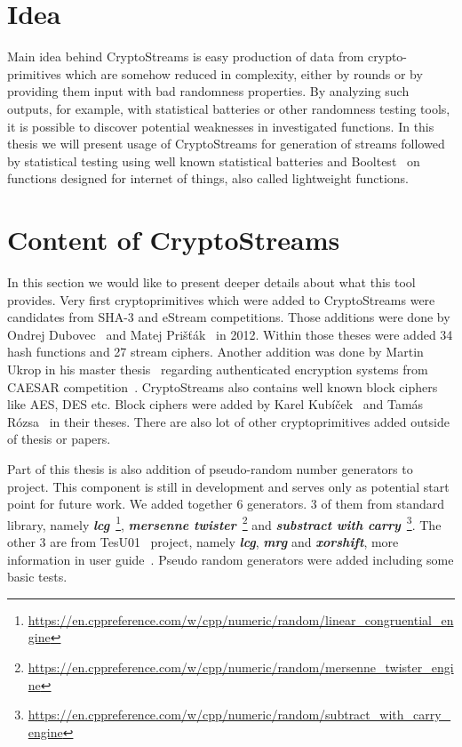 \documentclass[
    digital,    %
    oneside,    %
    color,
    11pt,
    nocover,
    notable,
    nolof,
    nolot,
    final
]{fithesis3}
\begin{document}
\section{Idea}

Main idea behind CryptoStreams is easy production of data from crypto-primitives which are somehow reduced in complexity, either by rounds or by providing them input with bad randomness properties. By analyzing such outputs, for example, with statistical batteries or other randomness testing tools, it is possible to discover potential weaknesses in investigated functions. In this thesis we will present usage of CryptoStreams for generation of streams followed by statistical testing using well known statistical batteries and Booltest~\cite{booltest-secrypt2017} on functions designed for internet of things, also called lightweight functions.

\section{Content of CryptoStreams}

In this section we would like to present deeper details about what this tool provides. Very first cryptoprimitives which were added to CryptoStreams were candidates from SHA-3 and eStream competitions. Those additions were done by Ondrej Dubovec~\cite{Dubovec2012thesis} and Matej Prišťák~\cite{Pristak2012thesis} in 2012. Within those theses were added 34 hash functions and 27 stream ciphers. Another addition was done by Martin Ukrop in his master thesis~\cite{Ukrop2016thesis} regarding authenticated encryption systems from CAESAR competition~\cite{caesar-competition}. CryptoStreams also contains well known block ciphers like AES, DES etc. Block ciphers were added by Karel Kubíček~\cite{Kubicek2017thesis} and Tamás Rózsa~\cite{Rozsa2018thesis} in their theses. There are also lot of other cryptoprimitives added outside of thesis or papers.


Part of this thesis is also addition of pseudo-random number generators to project. This component is still in development and serves only as potential start point for future work. We added together 6 generators. 3 of them from standard library, namely \textit{\textbf{lcg}}~\footnote{\url{ https://en.cppreference.com/w/cpp/numeric/random/linear\_congruential\_engine}}, \textbf{\textit{mersenne twister}}~\footnote{\url{https://en.cppreference.com/w/cpp/numeric/random/mersenne\_twister\_engine}} and \textbf{\textit{substract with carry}}~\footnote{\url{https://en.cppreference.com/w/cpp/numeric/random/subtract\_with\_carry_engine}}. The other 3 are from TesU01~\cite{l2007testu01} project, namely \textbf{\textit{lcg}}, \textbf{\textit{mrg}} and \textbf{\textit{xorshift}}, more information in user guide~\cite{LEcuyer07testu01}. Pseudo random generators were added including some basic tests.
\end{document}
